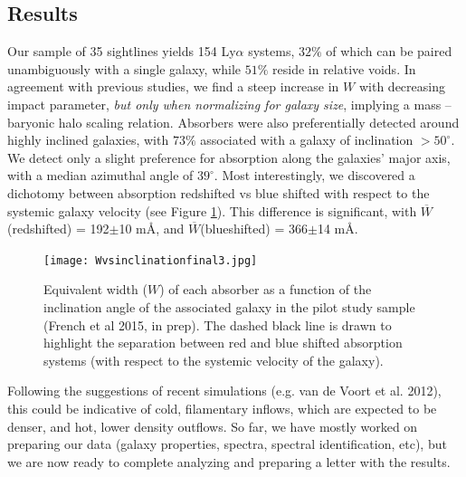 \documentclass[iop]{emulateapj-rtx4}
\begin{document}
\vspace{10pt}
\subsection{Results}

\indent Our sample of 35 sightlines yields 154 Ly$\alpha$ systems, $32\%$ of which can be paired unambiguously with a single galaxy, while $51\%$ reside in relative voids. In agreement with previous studies, we find a steep increase in $W$ with decreasing impact parameter, \textit{but only when normalizing for galaxy size}, implying a mass -- baryonic halo scaling relation. Absorbers were also preferentially detected around highly inclined galaxies, with $73\%$ associated with a galaxy of inclination $>50^{\circ}$. We detect only a slight preference for absorption along the galaxies' major axis, with a median azimuthal angle of $39^{\circ}$. Most interestingly, we discovered a dichotomy between absorption redshifted vs blue shifted with respect to the systemic galaxy velocity (see Figure \ref{dichotomy}). This difference is significant, with $\overline{W}$(redshifted) = 192$\pm$10 m\AA, and $\overline{W}$(blueshifted) = 366$\pm$14 m\AA. 

\begin{figure}[h!]
        \centering
        \vspace{-10pt}
        \texttt{[image: Wvsinclinationfinal3.jpg]}
        \caption{\small{Equivalent width ($W$) of each absorber as a function of the inclination angle of the associated galaxy in the pilot study sample (French et al 2015, in prep). The dashed black line is drawn to highlight the separation between red and blue shifted absorption systems (with respect to the systemic velocity of the galaxy).}}
        \label{dichotomy}
\end{figure} 


Following the suggestions of recent simulations (e.g. van de Voort et al. 2012), this could be indicative of cold, filamentary inflows, which are expected to be denser, and hot, lower density outflows. So far, we have mostly worked on preparing our data (galaxy properties, spectra, spectral identification, etc), but we are now ready to complete analyzing and preparing a letter with the results.



\vspace{10pt}
\end{document}
